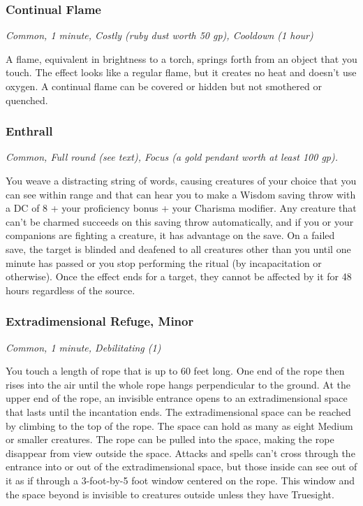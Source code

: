 \subsubsection{Continual Flame}
\textit{Common, 1 minute, Costly (ruby dust worth 50 gp), Cooldown (1 hour)}

A flame, equivalent in brightness to a torch, springs forth from an object that you touch. The effect looks like a regular flame, but it creates no heat and doesn't use oxygen. A continual flame can be covered or hidden but not smothered or quenched.

\subsubsection{Enthrall}
\textit{Common, Full round (see text), Focus (a gold pendant worth at least 100 gp).}

You weave a distracting string of words, causing creatures of your choice that you can see within range and that can hear you to make a Wisdom saving throw with a DC of 8 + your proficiency bonus + your Charisma modifier. Any creature that can't be charmed succeeds on this saving throw automatically, and if you or your companions are fighting a creature, it has advantage on the save. On a failed save, the target is blinded and deafened to all creatures other than you until one minute has passed or you stop performing the ritual (by incapacitation or otherwise). Once the effect ends for a target, they cannot be affected by it for 48 hours regardless of the source.

\subsubsection{Extradimensional Refuge, Minor}
\textit{Common, 1 minute, Debilitating (1)}

You touch a length of rope that is up to 60 feet long. One end of the rope then rises into the air until the whole rope hangs perpendicular to the ground. At the upper end of the rope, an invisible entrance opens to an extradimensional space that lasts until the incantation ends. The extradimensional space can be reached by climbing to the top of the rope. The space can hold as many as eight Medium or smaller creatures. The rope can be pulled into the space, making the rope disappear from view outside the space. Attacks and spells can't cross through the entrance into or out of the extradimensional space, but those inside can see out of it as if through a 3-foot-by-5 foot window centered on the rope. This window and the space beyond is invisible to creatures outside unless they have Truesight.

